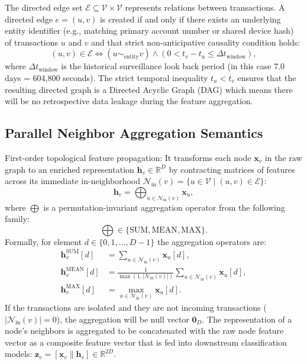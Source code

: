 \documentclass[journal]{IEEEtran}
\begin{document}
The directed edge set $\mathcal{E} \subseteq \mathcal{V} \times \mathcal{V}$ represents relations between transactions. A directed edge $e = (u, v)$ is created if and only if there exists an underlying entity identifier (e.g., matching primary account number or shared device hash) of transactions $u$ and $v$ and that strict non-anticipative causality condition holds:
\begin{equation}
    (u, v) \in \mathcal{E} \iff (u \sim_{\text{entity}} v) \land (0 < t_v - t_u \le \Delta t_{\text{window}}),
    \label{eq:causality}
\end{equation}
where $\Delta t_{\text{window}}$ is the historical surveillance look back period (in this case 7.0 days = 604,800 seconds). The strict temporal inequality $t_u < t_v$ ensures that the resulting directed graph is a Directed Acyclic Graph (DAG) which means there will be no retrospective data leakage during the feature aggregation.

\subsection{Parallel Neighbor Aggregation Semantics}
First-order topological feature propagation: It transforms each node $\mathbf{x}_v$ in the raw graph to an enriched representation $\mathbf{h}_v \in \mathbb{R}^D$ by contracting matrices of features across its immediate in-neighborhood $\mathcal{N}_{\text{in}}(v) = \{u \in \mathcal{V} \mid (u, v) \in \mathcal{E}\}$:
\begin{equation}
    \mathbf{h}_v = \bigoplus_{u \in \mathcal{N}_{\text{in}}(v)} \mathbf{x}_u,
    \label{eq:agg_general}
\end{equation}
where $\bigoplus$ is a permutation-invariant aggregation operator from the following family:
\begin{equation}
    \bigoplus \in \{\text{SUM}, \text{MEAN}, \text{MAX}\}.
    \label{eq:operators}
\end{equation}
Formally, for element $d \in \{0, 1, \dots, D-1\}$ the aggregation operators are:
\begin{align}
    \mathbf{h}_v^{\text{SUM}}[d] &= \sum_{u \in \mathcal{N}_{\text{in}}(v)} \mathbf{x}_u[d], \label{eq:sum} \\
    \mathbf{h}_v^{\text{MEAN}}[d] &= \frac{1}{\max(1, |\mathcal{N}_{\text{in}}(v)|)} \sum_{u \in \mathcal{N}_{\text{in}}(v)} \mathbf{x}_u[d], \label{eq:mean} \\
    \mathbf{h}_v^{\text{MAX}}[d] &= \max_{u \in \mathcal{N}_{\text{in}}(v)} \mathbf{x}_u[d]. \label{eq:max}
\end{align}
If the transactions are isolated and they are not incoming transactions ($|\mathcal{N}_{\text{in}}(v)| = 0$), the aggregation will be null vector $\mathbf{0}_D$. The representation of a node's neighbors is aggregated to be concatenated with the raw node feature vector as a composite feature vector that is fed into downstream classification models: $\mathbf{z}_v = [\mathbf{x}_v \parallel \mathbf{h}_v] \in \mathbb{R}^{2D}$.
\end{document}
